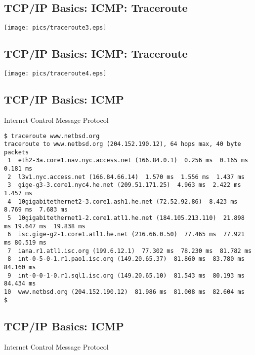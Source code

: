 \documentclass[xga]{xdvislides}
\begin{document}
\subsection{TCP/IP Basics: ICMP: Traceroute}
\vspace*{\fill}
\begin{center}
	\texttt{[image: pics/traceroute3.eps]}
\end{center}
\vspace*{\fill}

\subsection{TCP/IP Basics: ICMP: Traceroute}
\vspace*{\fill}
\begin{center}
	\texttt{[image: pics/traceroute4.eps]}
\end{center}
\vspace*{\fill}



\subsection{TCP/IP Basics: ICMP}
\begin{center}
Internet Control Message Protocol
\end{center}
\vspace{.2in}

\begin{verbatim}
$ traceroute www.netbsd.org
traceroute to www.netbsd.org (204.152.190.12), 64 hops max, 40 byte packets
 1  eth2-3a.core1.nav.nyc.access.net (166.84.0.1)  0.256 ms  0.165 ms 0.181 ms
 2  l3v1.nyc.access.net (166.84.66.14)  1.570 ms  1.556 ms  1.437 ms
 3  gige-g3-3.core1.nyc4.he.net (209.51.171.25)  4.963 ms  2.422 ms  1.457 ms
 4  10gigabitethernet2-3.core1.ash1.he.net (72.52.92.86)  8.423 ms  8.769 ms  7.683 ms
 5  10gigabitethernet1-2.core1.atl1.he.net (184.105.213.110)  21.898 ms 19.647 ms  19.838 ms
 6  isc.gige-g2-1.core1.atl1.he.net (216.66.0.50)  77.465 ms  77.921 ms 80.519 ms
 7  iana.r1.atl1.isc.org (199.6.12.1)  77.302 ms  78.230 ms  81.782 ms
 8  int-0-5-0-1.r1.pao1.isc.org (149.20.65.37)  81.860 ms  83.780 ms 84.160 ms
 9  int-0-0-1-0.r1.sql1.isc.org (149.20.65.10)  81.543 ms  80.193 ms 84.434 ms
10  www.netbsd.org (204.152.190.12)  81.986 ms  81.008 ms  82.604 ms
$
\end{verbatim}

\subsection{TCP/IP Basics: ICMP}
\begin{center}
Internet Control Message Protocol
\end{center}
\end{document}
